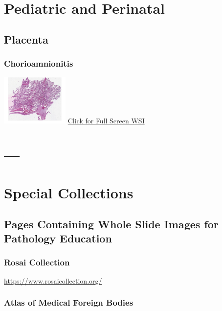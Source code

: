 \documentclass[
  letterpaper,
  paper=6in:9in,
  pagesize=pdftex,
  headinclude=on,
  footinclude=on,
  12pt]{scrbook}
\begin{document}
\part{Pediatric and Perinatal}

\hypertarget{sec-placenta}{%
\chapter{Placenta}\label{sec-placenta}}

\hypertarget{sec-chorioamnionitis}{%
\section{Chorioamnionitis}\label{sec-chorioamnionitis}}

\href{https://images.patolojiatlasi.com/chorioamnionitis/HE.html}{\includegraphics[width=0.25\textwidth,height=\textheight]{./screenshots/chorioamnionitis_screenshot.png}}
\href{https://images.patolojiatlasi.com/chorioamnionitis/HE.html}{Click
for Full Screen WSI}

\part{---}

\part{Special Collections}

\hypertarget{sec-wsi-pages}{%
\chapter{Pages Containing Whole Slide Images for Pathology
Education}\label{sec-wsi-pages}}

\hypertarget{sec-rosai-collection}{%
\section{Rosai Collection}\label{sec-rosai-collection}}

\url{https://www.rosaicollection.org/}

\hypertarget{sec-atlas-of-medical-foreign-bodies}{%
\section{Atlas of Medical Foreign
Bodies}\label{sec-atlas-of-medical-foreign-bodies}}
\end{document}
